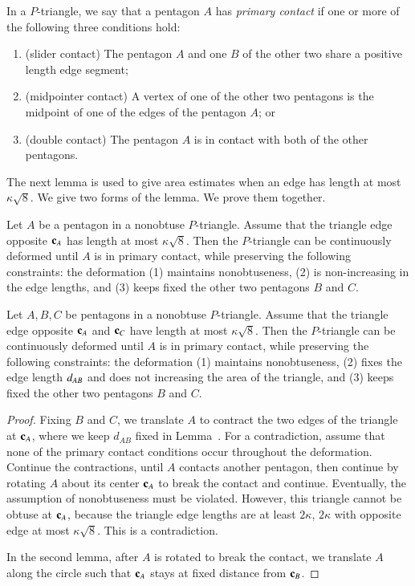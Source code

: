 \begin{definition}
In a $P$-triangle, we say that a pentagon $A$ has {\it primary
  contact} if one or more of the following three conditions hold:
\begin{enumerate}
\item (slider contact) The pentagon $A$ and one $B$ of the other two
   share a positive length edge segment;
\item (midpointer contact) A vertex of one of the other two pentagons
  is the midpoint of one of the edges of the pentagon $A$; or
\item (double contact) The pentagon $A$ is in contact with both of the
  other pentagons.
\end{enumerate}
\end{definition}

The next lemma is used to give area estimates when an edge has length
at most $\kappa\sqrt{8}$.  We give two forms of the lemma.  We prove
them together.

\begin{lemma} 
  Let $A$ be a pentagon in a nonobtuse $P$-triangle.  Assume that the
  triangle edge opposite ${\mathbf c}_A$ has length at most $\kappa\sqrt{8}$.
  Then the $P$-triangle can be continuously deformed until $A$ is in
  primary contact, while preserving the following constraints: the
  deformation (1) maintains nonobtuseness, (2) is non-increasing in
  the edge lengths, and (3) keeps fixed the other two pentagons $B$
  and $C$.
\end{lemma}

\begin{lemma} 
  Let $A,B,C$ be pentagons in a nonobtuse $P$-triangle.  Assume that
  the triangle edge opposite ${\mathbf c}_A$ and ${\mathbf c}_C$ have length at most
  $\kappa\sqrt{8}$.  Then the $P$-triangle can be continuously
  deformed until $A$ is in primary contact, while preserving the
  following constraints: the deformation (1) maintains nonobtuseness,
  (2) fixes the edge length $d_{AB}$ and does not increasing the area
  of the triangle, and (3) keeps fixed the other two pentagons $B$ and
  $C$.
\end{lemma}

\begin{proof} Fixing $B$ and $C$, we translate $A$ to contract the two
  edges of the triangle at ${\mathbf c}_A$, where we keep $d_{AB}$ fixed in
  Lemma~.  For a contradiction, assume that none
  of the primary contact conditions occur throughout the deformation.
  Continue the contractions, until $A$ contacts another pentagon, then
  continue by rotating $A$ about its center ${\mathbf c}_A$ to break the
  contact and continue.  Eventually, the assumption of nonobtuseness
  must be violated.  However, this triangle cannot be obtuse at
  ${\mathbf c}_A$, because the triangle edge lengths are at least $2 \kappa$,
  $2 \kappa$ with opposite edge at most $\kappa\sqrt{8}$. This is a
  contradiction.

  In the second lemma, after $A$ is rotated to break the contact, we
  translate $A$ along the circle such that ${\mathbf c}_A$ stays at fixed
  distance from ${\mathbf c}_B$.
\end{proof}

